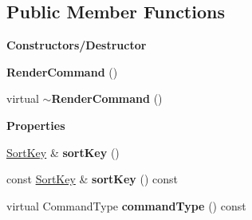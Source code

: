 \subsection*{Public Member Functions}
\begin{Indent}\textbf{ Constructors/\+Destructor}\par
\begin{DoxyCompactItemize}
\item 
\mbox{\label{classrev_1_1_render_command_ac30c43c45b2338c4b1d638cfcd995e20}} 
{\bfseries Render\+Command} ()
\item 
\mbox{\label{classrev_1_1_render_command_a3b5f97d991ad39a2e545227a0c66c16a}} 
virtual {\bfseries $\sim$\+Render\+Command} ()
\end{DoxyCompactItemize}
\end{Indent}
\begin{Indent}\textbf{ Properties}\par
\begin{DoxyCompactItemize}
\item 
\mbox{\label{classrev_1_1_render_command_a4108d4bfbafa55fa03e820913d50bb15}} 
\mbox{\hyperlink{classrev_1_1_sort_key}{Sort\+Key}} \& {\bfseries sort\+Key} ()
\item 
\mbox{\label{classrev_1_1_render_command_a185a01fefd3dc7c855df0d636d89d181}} 
const \mbox{\hyperlink{classrev_1_1_sort_key}{Sort\+Key}} \& {\bfseries sort\+Key} () const
\item 
\mbox{\label{classrev_1_1_render_command_a4f835dba0b25d2332f1acb20ea3d6deb}} 
virtual Command\+Type {\bfseries command\+Type} () const
\end{DoxyCompactItemize}
\end{Indent}
